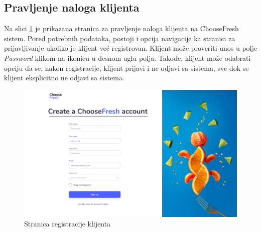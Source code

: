\subsection{Pravljenje naloga klijenta}

Na slici \ref{fig:SignUp} je prikazana stranica za pravljenje naloga klijenta na ChooseFresh sistem. Pored potrebnih podataka, postoji i opcija navigacije ka stranici za prijavljivanje ukoliko je klijent već registrovan. Klijent može proveriti unos u polje \textit{Password} klikom na ikonicu u desnom uglu polja. Takođe, klijent može odabrati opciju da se, nakon registracije, klijent prijavi i ne odjavi sa sistema, sve dok se klijent eksplicitno ne odjavi sa sistema.

\begin{figure}[H]
	\begin{center}
		\includegraphics[width=\textwidth]{UI/SignUp.jpg}
    		\caption{Stranica registracije klijenta}
    \label{fig:SignUp}
    \end{center}
\end{figure}
